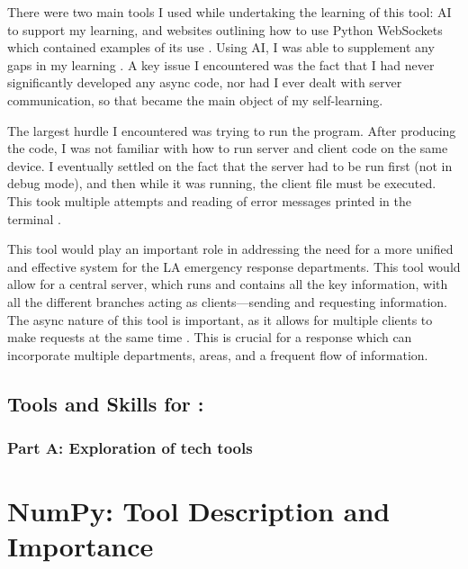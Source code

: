 \documentclass[a4paper, 11pt]{report}
\begin{document}
There were two main tools I used while undertaking the learning of this tool: AI to support my learning, and websites outlining how to use Python WebSockets which contained examples of its use \cite{obregon2023}. Using AI, I was able to supplement any gaps in my learning \cite{chatgpt2025}. A key issue I encountered was the fact that I had never significantly developed any async code, nor had I ever dealt with server communication, so that became the main object of my self-learning.

The largest hurdle I encountered was trying to run the program. After producing the code, I was not familiar with how to run server and client code on the same device. I eventually settled on the fact that the server had to be run first (not in debug mode), and then while it was running, the client file must be executed. This took multiple attempts and reading of error messages printed in the terminal \cite{chatgpt2025}.

This tool would play an important role in addressing the need for a more unified and effective system for the LA emergency response departments. This tool would allow for a central server, which runs and contains all the key information, with all the different branches acting as clients—sending and requesting information. The async nature of this tool is important, as it allows for multiple clients to make requests at the same time \cite{pypi_websockets}. This is crucial for a response which can incorporate multiple departments, areas, and a frequent flow of information.


\clearpage






\subsection{Tools and Skills for \majB: \studB}

\subsubsection{Part A: Exploration of tech tools}

\section*{NumPy: Tool Description and Importance}
\end{document}
